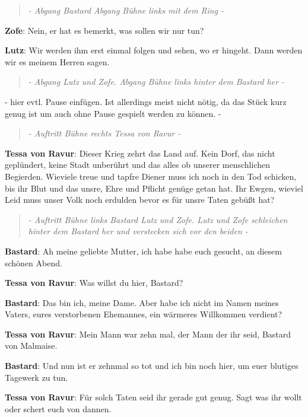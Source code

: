 \documentclass[a5paper,7pt, twocolumn]{book}
\begin{document}
\begin{quote}
  \textit{- Abgang Bastard Abgang Bühne links mit dem Ring -}
 \end{quote}


\textbf{Zofe}: Nein, er hat es bemerkt, was sollen wir nur tun?

\textbf{Lutz}: Wir werden ihm erst einmal folgen und sehen, wo er hingeht. Dann werden wir es meinem Herren sagen.

\begin{quote}
  \textit{- Abgang Lutz und Zofe. Abgang Bühne links hinter dem Bastard her -}
 \end{quote}

- hier evtl. Pause einfügen. Ist allerdings meist nicht nötig, da das Stück kurz genug ist um auch ohne Pause gespielt werden zu können. -

\begin{quote}
  \textit{- Auftritt Bühne rechts Tessa von Ravur -}
 \end{quote}


\textbf{Tessa von Ravur}: Dieser Krieg zehrt das Land auf. Kein Dorf, das nicht geplündert, keine Stadt unberührt und das alles ob unserer menschlichen Begierden. Wieviele treue und tapfre Diener muss ich noch in den Tod schicken, bis ihr Blut und das unsre, Ehre und Pflicht genüge getan hat. Ihr Ewgen, wieviel Leid muss unser Volk noch erdulden bevor es für unsre Taten gebüßt hat?

\begin{quote}
  \textit{- Auftritt Bühne links Bastard Lutz und Zofe. Lutz und Zofe schleichen hinter dem Bastard her und verstecken sich vor den beiden -}
 \end{quote}

\textbf{Bastard}: Ah meine geliebte Mutter, ich habe habe euch gesucht, an diesem schönen Abend.

\textbf{Tessa von Ravur}: Was willst du hier, Bastard?

\textbf{Bastard}: Das bin ich, meine Dame. Aber habe ich nicht im Namen meines Vaters, eures verstorbenen Ehemannes, ein wärmeres Willkommen verdient?

\textbf{Tessa von Ravur}: Mein Mann war zehn mal, der Mann der ihr seid, Bastard von Malmaise.

\textbf{Bastard}: Und nun ist er zehnmal so tot und ich bin noch hier, um euer blutiges Tagewerk zu tun.

\textbf{Tessa von Ravur}: Für solch Taten seid ihr gerade gut genug. Sagt was ihr wollt oder schert euch von dannen.
\end{document}
